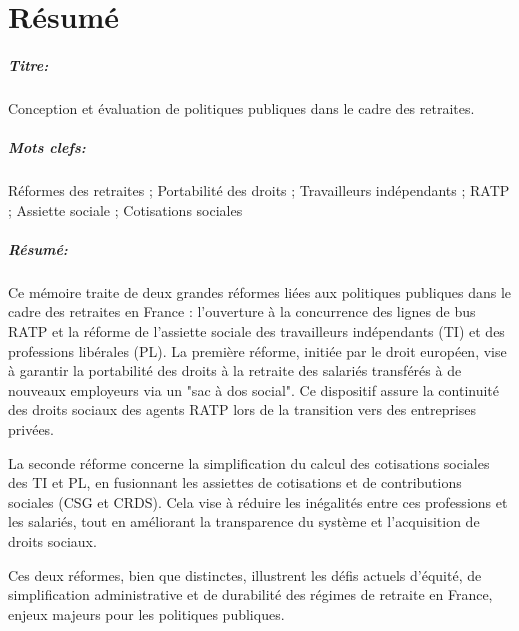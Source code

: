 \chapter*{Résumé}

\begin{mdframed}
\vspace{-.25cm}
\paragraph*{Titre:} Conception et évaluation de politiques publiques dans le cadre des retraites.

\begin{small}
\vspace{-.25cm}
\paragraph*{Mots clefs:} Réformes des retraites ; Portabilité des droits ; Travailleurs indépendants ; RATP ; Assiette sociale ; Cotisations sociales

\vspace{-.5cm}
\setlength{\columnsep}{12pt} %
\begin{multicols}{2}
\paragraph*{Résumé:} 
Ce mémoire traite de deux grandes réformes liées aux politiques publiques dans le cadre des retraites en France : l'ouverture à la concurrence des lignes de bus RATP et la réforme de l’assiette sociale des travailleurs indépendants (TI) et des professions libérales (PL). La première réforme, initiée par le droit européen, vise à garantir la portabilité des droits à la retraite des salariés transférés à de nouveaux employeurs via un "sac à dos social". Ce dispositif assure la continuité des droits sociaux des agents RATP lors de la transition vers des entreprises privées.

La seconde réforme concerne la simplification du calcul des cotisations sociales des TI et PL, en fusionnant les assiettes de cotisations et de contributions sociales (CSG et CRDS). Cela vise à réduire les inégalités entre ces professions et les salariés, tout en améliorant la transparence du système et l’acquisition de droits sociaux.

Ces deux réformes, bien que distinctes, illustrent les défis actuels d'équité, de simplification administrative et de durabilité des régimes de retraite en France, enjeux majeurs pour les politiques publiques.

\end{multicols}
\end{small}
\end{mdframed}

\clearpage
